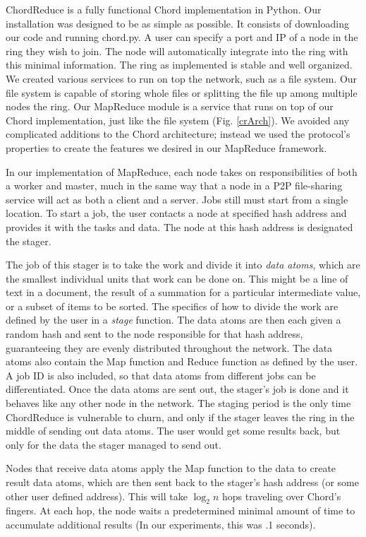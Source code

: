 \documentclass[10pt, conference, compsocconf]{IEEEtran}
\begin{document}
ChordReduce is a fully functional Chord implementation in Python.  Our installation was designed to be as simple as possible.  It consists of downloading our code \cite{code} and running chord.py.  A user can specify a port and IP of a node in the ring they wish to join.  The node will automatically integrate into the ring with this minimal information.  The ring as implemented is stable and well organized.  We created various services to run on top the network, such as a file system.  Our file system is capable of storing whole files or splitting the file up among multiple nodes the ring.  Our MapReduce module is a service that runs on top of our Chord implementation, just like the file system (Fig. \ref{crArch}).  We avoided any complicated additions to the Chord architecture; instead we used the protocol's properties to create the features we desired in our MapReduce framework. 
  
In our implementation of MapReduce, each node takes on responsibilities of both a worker and master, much in the same way that a node in a P2P file-sharing service will act as both a client and a server.  Jobs still must start from a single location.  To start a job, the user contacts a node at specified hash address and provides it with the tasks and data.  The node at this hash address is designated the stager. 

The job of this stager is to take the work and divide it into \emph{data atoms}, which are the smallest individual units that work can be done on.  This might be a line of text in a document, the result of a summation for a particular intermediate value, or a subset of items to be sorted.  The specifics of how to divide the work are defined by the user in a \emph{stage} function.  The data atoms are then each given a random hash and sent to the node responsible for that hash address, guaranteeing they are evenly distributed throughout the network.  The data atoms also contain the Map function and Reduce function as defined by the user.  A job ID is also included, so that data atoms from different jobs can be differentiated.  Once the data atoms are sent out, the stager's job is done and it behaves like any other node in the network. The staging period is the only time ChordReduce is vulnerable to churn, and only if the stager leaves the ring in the middle of sending out data atoms.  The user would get some results back, but only for the data the stager managed to send out.

Nodes that receive data atoms apply the Map function to the data to create result data atoms, which are then sent back to the stager's hash address (or some other user defined address).  This will take $\log_{2} n$ hops traveling over Chord's fingers.  At each hop, the node waits a predetermined minimal amount of time to accumulate additional results (In our experiments, this was .1 seconds).
\end{document}
